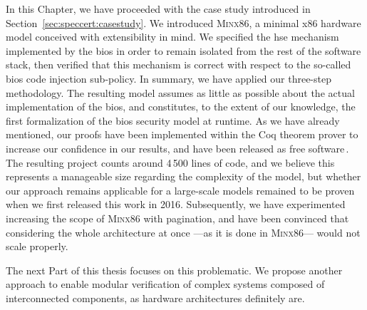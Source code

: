 In this Chapter, we have proceeded with the case study introduced in
Section~\ref{sec:speccert:casestudy}.
%
We introduced {\scshape Minx86}, a minimal x86 hardware model conceived with
extensibility in mind.
%
We specified the \ac{hse} mechanism implemented by the \ac{bios} in order to
remain isolated from the rest of the software stack, then verified that this
mechanism is correct with respect to the so-called \ac{bios} code injection
sub-policy.
%
In summary, we have applied our three-step methodology.
%
The resulting model assumes as little as possible about the actual
implementation of the \ac{bios}, and constitutes, to the extent of our
knowledge, the first formalization of the \ac{bios} security model at runtime.
%
As we have already mentioned, our proofs have been implemented within the Coq
theorem prover to increase our confidence in our results, and have been released
as free software\,\cite{letan2016speccertcode}.
%
The resulting project counts around 4\,500 lines of code, and we believe this
represents a manageable size regarding the complexity of the model, but whether
our approach remains applicable for a large-scale models remained to be proven
when we first released this work in 2016.
%
Subsequently, we have experimented increasing the scope of {\scshape Minx86}
with pagination, and have been convinced that considering the whole architecture
at once ---as it is done in {\scshape Minx86}--- would not scale properly.

The next Part of this thesis focuses on this problematic.
%
We propose another approach to enable modular verification of complex systems
composed of interconnected components, as hardware architectures definitely are.

